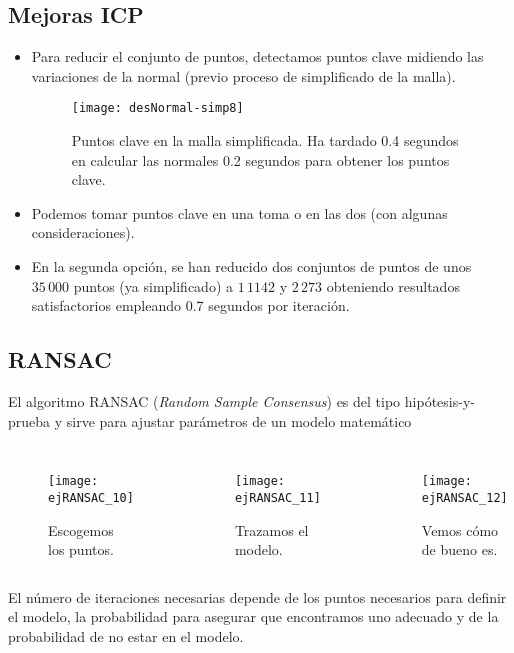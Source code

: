 \documentclass[9pt]{beamer}
\begin{document}
	\subsection{Mejoras ICP}
	\begin{frame}
		\justifying
		\begin{itemize}
			\item Para reducir el conjunto de puntos, detectamos puntos clave midiendo las variaciones de la normal (previo proceso de simplificado de la malla).
			
			\begin{figure}[h!]
				\texttt{[image: desNormal-simp8]}
				\caption{Puntos clave en la malla simplificada. Ha tardado 0.4 segundos en calcular las normales 0.2 segundos para obtener los puntos clave.}
			\end{figure} 
			
			\item Podemos tomar puntos clave en una toma o en las dos (con algunas consideraciones).
			\item En la segunda opción, se han reducido dos conjuntos de puntos de unos $ 35\,000 $ puntos (ya simplificado) a $ 1\,1142 $ y $ 2\,273 $ obteniendo resultados satisfactorios empleando 0.7 segundos por iteración.
		\end{itemize}
		
		
	\end{frame}

	\subsection{RANSAC}
	\begin{frame}
		\justifying
		El algoritmo RANSAC (\textit{Random Sample Consensus}) es del tipo hipótesis-y-prueba y sirve para ajustar parámetros de un modelo matemático
		
		\begin{columns}
			\column{0.33\textwidth}
			\begin{figure}[h!]
				\texttt{[image: ejRANSAC\_10]}
				\caption{Escogemos los puntos.}
			\end{figure}
			\column{0.33\textwidth}
			\begin{figure}[h!]
				\texttt{[image: ejRANSAC\_11]}
				\caption{Trazamos el modelo.}
			\end{figure} 
			\column{0.33\textwidth}
			\begin{figure}[h!]
				\texttt{[image: ejRANSAC\_12]}
				\caption{Vemos cómo de bueno es.}
			\end{figure} 
		\end{columns}
		El número de iteraciones necesarias depende de los puntos necesarios para definir el modelo, la probabilidad para asegurar que encontramos uno adecuado y de la probabilidad de no estar en el modelo.
	\end{frame}	
\end{document}
